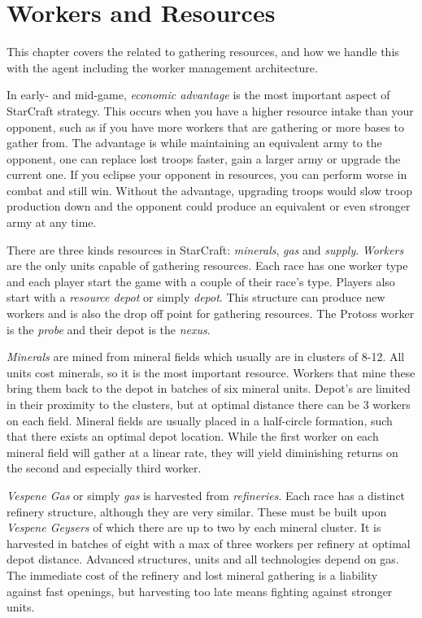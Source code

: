 \chapter{Workers and Resources}
\label{ch:resources}
This chapter covers the related to gathering resources, and how we handle this with the agent including the worker management architecture. 

In early- and mid-game, \emph{economic advantage} is the most important aspect of StarCraft strategy. This occurs when you have a higher resource intake than your opponent, such as if you have more workers that are gathering or more bases to gather from. The advantage is while maintaining an equivalent army to the opponent, one can replace lost troops faster, gain a larger army or upgrade the current one. If you eclipse your opponent in resources, you can perform worse in combat and still win. Without the advantage, upgrading troops would slow troop production down and the opponent could produce an equivalent or even stronger army at any time.

There are three kinds resources in StarCraft: \emph{minerals}, \emph{gas} and \emph{supply}. \emph{Workers} are the only units capable of gathering resources. Each race has one worker type and each player start the game with a couple of their race's type. Players also start with a \emph{resource depot} or simply \emph{depot}. This structure can produce new workers and is also the drop off point for gathering resources. The Protoss worker is the \emph{probe} and their depot is the \emph{nexus}.

\emph{Minerals} are mined from mineral fields which usually are in clusters of 8-12. All units cost minerals, so it is the most important resource. Workers that mine these bring them back to the depot in batches of six mineral units. Depot's are limited in their proximity to the clusters, but at optimal distance there can be 3 workers on each field. Mineral fields are usually placed in a half-circle formation, such that there exists an optimal depot location. While the first worker on each mineral field will gather at a linear rate, they will yield diminishing returns on the second and especially third worker.

\emph{Vespene Gas} or simply \emph{gas} is harvested from \emph{refineries}. Each race has a distinct refinery structure, although they are very similar. These must be built upon \emph{Vespene Geysers} of which there are up to two by each mineral cluster. It is harvested in batches of eight with a max of three workers per refinery at optimal depot distance. Advanced structures, units and all technologies depend on gas. The immediate cost of the refinery and lost mineral gathering is a liability against fast openings, but harvesting too late means fighting against stronger units.

